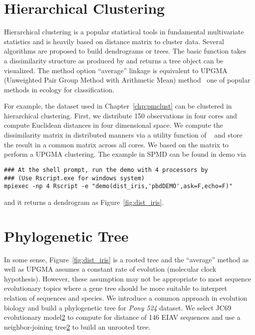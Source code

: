 \section{Hierarchical Clustering}

Hierarchical clustering is a popular statistical tools in fundamental
multivariate statistics and is heavily based on distance matrix to cluster
data. Several algorithms are proposed to build dendrograms or trees.
The basic function 
takes a dissimilarity structure as
produced by  and returns a tree object can be visualized.
The method option ``average'' linkage is equivalent to
UPGMA (Unweighted Pair Group Method with Arithmetic Mean)
method~\citep{Sokal1985} one of popular methods in ecology for classification.

For example, the  dataset used in Chapter~\ref{chp:pmclust} can be
clustered in hierarchical clustering. First, we distribute 150 observations
in four cores and compute Euclidean distances in four dimensional space.
We compute the dissimilarity matrix in distributed manners via a
utility function 
of ~\citep{Chen2012pbdMPIpackage}
and store the result in a common matrix across all cores. We based on
the matrix to perform a UPGMA clustering. The example in SPMD can be
found in demo via
\begin{lstlisting}
### At the shell prompt, run the demo with 4 processors by
### (Use Rscript.exe for windows system)
mpiexec -np 4 Rscript -e "demo(dist_iris,'pbdDEMO',ask=F,echo=F)"
\end{lstlisting}
and it returns a dendrogram as Figure~\ref{fig:dist_iris}.



\section{Phylogenetic Tree}

In some sense, Figure~\ref{fig:dist_iris} is a rooted tree and the
``average'' method as well as UPGMA assumes a constant rate of evolution
(molecular clock hypothesis). However, these assumption may not be
appropriate to most sequence evolutionary topics where a gene tree should
be more suitable to interpret relation of sequences and species.
We introduce a common approach in evolution biology and build a
phylogenetic tree for {\it Pony 524} dataset.
We select JC69 evolutionary model\ref{}
to compute for distance of 146 EIAV sequences and
use a neighbor-joining tree\ref{} to build an unrooted tree.

